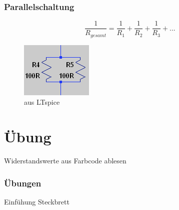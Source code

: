 \begin{frame}
    \frametitle{Parallelschaltung}
        $$\frac{1}{R_{gesamt}} = \frac{1}{R_1} + \frac{1}{R_2} + \frac{1}{R_3} + ...$$
        
	\begin{center}
    \begin{figure}
        \includegraphics[width=\textwidth,height=.75\textheight,keepaspectratio]{e04/Parallel.png}
        \caption{aus LTspice}
      \end{figure}
    \end{center}
    

\end{frame}


\section*{Übung}

\begin{frame}

	\begin{center}
        Widerstandswerte aus Farbcode ablesen
    \end{center}
    
\end{frame}

\begin{frame}
  \frametitle{Übungen}
  \pause
  \begin{center}
    Einfühung Steckbrett
  \end{center}
\end{frame}

